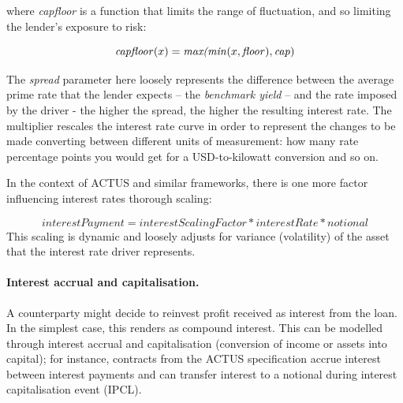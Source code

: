 \documentclass[runningheads]{llncs}
\newcommand{\ident}[1]{\mbox{\emph{#1}}}
\begin{document}
\noindent
where \emph{capfloor} is a function that limits the range of fluctuation,  
and so limiting the lender's exposure to risk:

\noindent 
\begin{equation*}
\ident{capfloor}(x)=\ident{max(min}(x,\ident{floor}),\ident{cap})
\end{equation*}

\noindent
The \emph{spread} parameter here loosely represents the difference between
the average prime 
rate that the lender expects -- the \emph{benchmark yield} -- and
the rate imposed by the driver - the higher the spread, the higher
the resulting interest rate. The multiplier %
rescales the interest rate curve 
in order to represent the changes to be made converting between different units
of measurement: how many rate percentage points 
you would get for a USD-to-kilowatt conversion
and so on.

In the context of ACTUS and similar frameworks, 
there is
one more factor influencing interest rates thorough scaling:

\noindent 
\begin{equation*}
interestPayment=interestScalingFactor*interestRate*notional
\end{equation*}
\noindent
This scaling is dynamic and loosely adjusts for variance (volatility)
of the asset that the interest rate driver represents.

\paragraph*{Interest accrual and capitalisation. }

A counterparty might decide to reinvest profit received as interest
from the %
loan. In the simplest case, this renders as compound
interest. This can be modelled through interest accrual and capitalisation (conversion of income or assets into capital);
for instance, contracts from the ACTUS specification accrue interest
between interest payments and can transfer interest to a notional
during interest capitalisation event (IPCL).
\end{document}
